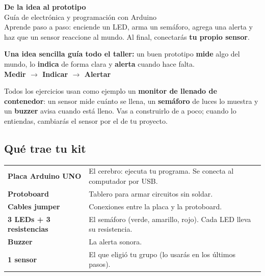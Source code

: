 \documentclass[10pt,letterpaper]{article}
\begin{document}
\begin{tcolorbox}[enhanced, colback=AIEPNavy, colframe=AIEPNavy, arc=0mm,
  boxrule=0pt, left=5mm, right=5mm, top=5mm, bottom=5mm]
{\color{white}\Huge\bfseries De la idea al prototipo}\\[2mm]
{\color{white}\Large Guía de electrónica y programación con Arduino}\\[3mm]
{\color{AIEPSoftBlue} Aprende paso a paso: enciende un LED, arma un semáforo, agrega una alerta
y haz que un sensor reaccione al mundo. Al final, conectarás \textbf{tu propio sensor}.}
\end{tcolorbox}

\begin{objetivo}
\textbf{Una idea sencilla guía todo el taller:} un buen prototipo \textbf{mide} algo del mundo,
lo \textbf{indica} de forma clara y \textbf{alerta} cuando hace falta.\\[1mm]
\textbf{Medir \;$\rightarrow$\; Indicar \;$\rightarrow$\; Alertar}
\end{objetivo}

Todos los ejercicios usan como ejemplo un \textbf{monitor de llenado de contenedor}: un sensor
mide cuánto se llena, un \textbf{semáforo} de luces lo muestra y un \textbf{buzzer} avisa cuando
está lleno. Vas a construirlo de a poco; cuando lo entiendas, cambiarás el sensor por el de tu
proyecto.

\subsection{Qué trae tu kit}
\begin{tabularx}{\linewidth}{@{}L{4.4cm}Y@{}}
\hline
\textbf{Placa Arduino UNO} & El cerebro: ejecuta tu programa. Se conecta al computador por USB.\\
\textbf{Protoboard} & Tablero para armar circuitos sin soldar.\\
\textbf{Cables jumper} & Conexiones entre la placa y la protoboard.\\
\textbf{3 LEDs + 3 resistencias} & El semáforo (verde, amarillo, rojo). Cada LED lleva su resistencia.\\
\textbf{Buzzer} & La alerta sonora.\\
\textbf{1 sensor} & El que eligió tu grupo (lo usarás en los últimos pasos).\\
\hline
\end{tabularx}

\end{document}
